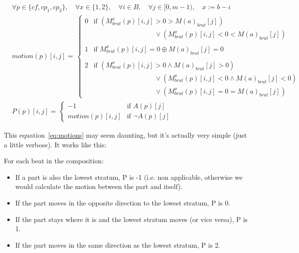 \begin{equation}
\begin{aligned}
&\forall p \in \{\mathit{cf}, cp_1, cp_2\}, \quad \forall x \in \{1, 2\}, \quad \forall i \in B, \quad \forall j \in [0, m - 1),\quad x := b - i\\
    &motion(p)[i,j] = \,  
    \begin{cases}
        0 &\text{if } (M_{brut}^{x}(p)[i, j] > 0 > M(a)_{brut}[j]) \\ & \quad \quad \quad \quad \quad \quad \quad \quad \quad  \vee (M_{brut}^{x}(p)[i, j] < 0 < M(a)_{brut}[j]) \\
        &\\
        1 &\text{if } M_{brut}^{x}(p)[i, j] = 0  \oplus M(a)_{brut}[j]=0 \\
        &\\
        2 &\text{if } (M_{brut}^{x}(p)[i, j] > 0 \land M(a)_{brut}[j] > 0) \\ & \quad \quad \quad \quad \quad \quad \quad \quad \quad   \vee  (M_{brut}^{x}(p)[i, j] < 0 \land M(a)_{brut}[j] <0)\\
        &\quad \quad \quad \quad \quad \quad \quad \quad \quad \vee (M_{brut}^{x}(p)[i, j] = 0 = M(a)_{brut}[j])
    \end{cases} 
    \\
    &P(p)[i,j] = \,  
    \begin{cases}
        -1 & \text{if } A(p)[j] \\
        motion(p)[i,j] & \text{if } \neg A(p)[j]
    \end{cases}
\end{aligned}
\label{eq:motions}
\end{equation}

This equation~\ref{eq:motions} may seem daunting, but it's actually very simple (just a little verbose).
It works like this: 

For each beat in the composition:
\begin{itemize}
    \item If a part is also the lowest stratum, P is -1 (i.e. non applicable, otherwise we would calculate the motion between the part and itself).
    \item If the part moves in the opposite direction to the lowest stratum, P is 0.
    \item If the part stays where it is and the lowest stratum moves (or vice versa), P is 1.
    \item If the part moves in the same direction as the lowest stratum, P is 2.
\end{itemize}

